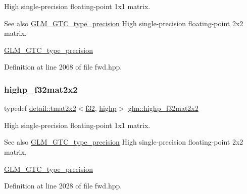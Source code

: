 High single-\/precision floating-\/point 1x1 matrix. \begin{DoxySeeAlso}{See also}
\hyperlink{group__gtc__type__precision}{G\+L\+M\+\_\+\+G\+T\+C\+\_\+type\+\_\+precision} High single-\/precision floating-\/point 2x2 matrix. 

\hyperlink{group__gtc__type__precision}{G\+L\+M\+\_\+\+G\+T\+C\+\_\+type\+\_\+precision} 
\end{DoxySeeAlso}


Definition at line 2068 of file fwd.\+hpp.

\mbox{\label{group__gtc__type__precision_gaf3a2cc948ca6fd168391138ce6fdd100}} 
\subsubsection{\texorpdfstring{highp\+\_\+f32mat2x2}{highp\_f32mat2x2}}
{\footnotesize\ttfamily typedef \hyperlink{structglm_1_1detail_1_1tmat2x2}{detail\+::tmat2x2}$<$\hyperlink{group__gtc__type__precision_ga0ec999b57f5330d9021256e96038df04}{f32}, \hyperlink{namespaceglm_a0f04f086094c747d227af4425893f545ac6f7eab42eacbb10d59a58e95e362074}{highp}$>$ \hyperlink{group__gtc__type__precision_gaf3a2cc948ca6fd168391138ce6fdd100}{glm\+::highp\+\_\+f32mat2x2}}

High single-\/precision floating-\/point 1x1 matrix. \begin{DoxySeeAlso}{See also}
\hyperlink{group__gtc__type__precision}{G\+L\+M\+\_\+\+G\+T\+C\+\_\+type\+\_\+precision} High single-\/precision floating-\/point 2x2 matrix. 

\hyperlink{group__gtc__type__precision}{G\+L\+M\+\_\+\+G\+T\+C\+\_\+type\+\_\+precision} 
\end{DoxySeeAlso}


Definition at line 2028 of file fwd.\+hpp.

\mbox{\label{group__gtc__type__precision_ga53613c1b93f81207065a8a935ff02a81}} 
